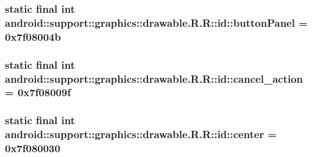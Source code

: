 \hypertarget{classandroid_1_1support_1_1graphics_1_1drawable_1_1_r_1_1id_a72bd14d4be99321e71159cafdb96a06}{
\subsubsection[{buttonPanel}]{\setlength{\rightskip}{0pt plus 5cm}static final int android::support::graphics::drawable.R.R::id::buttonPanel = 0x7f08004b}}
\label{classandroid_1_1support_1_1graphics_1_1drawable_1_1_r_1_1id_a72bd14d4be99321e71159cafdb96a06}


\hypertarget{classandroid_1_1support_1_1graphics_1_1drawable_1_1_r_1_1id_014c7b6b5d02c5ec34af5e123819ed45}{
\subsubsection[{cancel\_\-action}]{\setlength{\rightskip}{0pt plus 5cm}static final int android::support::graphics::drawable.R.R::id::cancel\_\-action = 0x7f08009f}}
\label{classandroid_1_1support_1_1graphics_1_1drawable_1_1_r_1_1id_014c7b6b5d02c5ec34af5e123819ed45}


\hypertarget{classandroid_1_1support_1_1graphics_1_1drawable_1_1_r_1_1id_b2196f4c465424b23c20ae7ab0034a15}{
\subsubsection[{center}]{\setlength{\rightskip}{0pt plus 5cm}static final int android::support::graphics::drawable.R.R::id::center = 0x7f080030}}
\label{classandroid_1_1support_1_1graphics_1_1drawable_1_1_r_1_1id_b2196f4c465424b23c20ae7ab0034a15}


